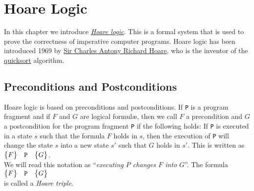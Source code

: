 \chapter{Hoare Logic}
In this chapter we introduce \href{http://en.wikipedia.org/wiki/Hoare_logic}{\emph{Hoare logic}}.
This is a formal system that is used to prove the correctness of imperative computer programs.  
Hoare logic has been introduced 1969 by  
\href{http://en.wikipedia.org/wiki/C._A._R._Hoare}{Sir Charles Antony Richard Hoare}, 
who is the inventor of the \href{http://en.wikipedia.org/wiki/Quicksort}{quicksort} algorithm.
 

\section{Preconditions and Postconditions}
Hoare logic is based on preconditions and postconditions.  If \texttt{P}
 is a program fragment and if $F$ and $G$ are logical formul\ae, then we call
$F$ a precondition and $G$ a postcondition for the program fragment \texttt{P}
if the following holds:  If \texttt{P} is executed in a state $s$ such that the formula $F$ holds in
$s$, then the execution of \texttt{P} will change the state $s$ into a new state $s'$ such that 
$G$ holds in $s'$.  This is written as
\\[0.2cm]
\hspace*{1.3cm}
$ \bigl\{F\bigr\}\quad\texttt{P}\quad\bigl\{G\bigr\} $.
\\[0.2cm]
We will read this notation as ``\emph{executing $P$ changes $F$ into $G$}''.
The formula
\\[0.2cm]
\hspace*{1.3cm}
$ \bigl\{F\bigr\}\quad\texttt{P}\quad\bigl\{G\bigr\} $
\\[0.2cm]
is called a \emph{Hoare triple}.
\vspace*{0.3cm}


